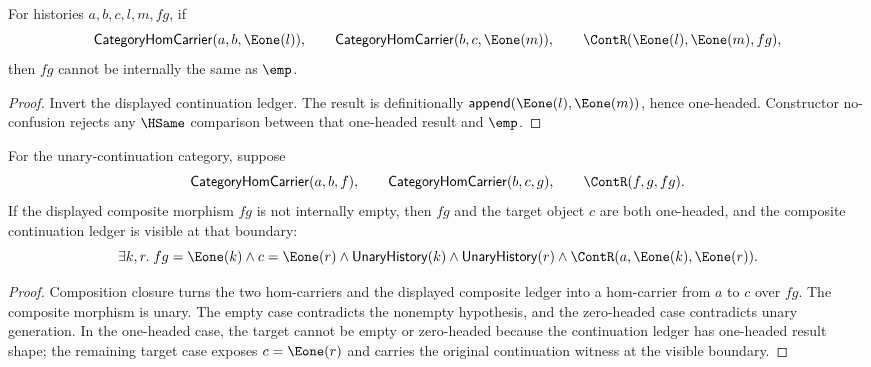 \begin{theorem}
\label{thm:category-hom-carrier-visible-composite-result-not-empty}
For histories $a,b,c,l,m,fg$, if
$$
\mathsf{CategoryHomCarrier}(a,b,\Eone(l)),\qquad
\mathsf{CategoryHomCarrier}(b,c,\Eone(m)),\qquad
\ContR(\Eone(l),\Eone(m),fg),
$$
then $fg$ cannot be internally the same as $\emp$.
\end{theorem}
\begin{proof}
Invert the displayed continuation ledger. The result is definitionally
$\mathsf{append}(\Eone(l),\Eone(m))$, hence one-headed. Constructor
no-confusion rejects any $\HSame$ comparison between that one-headed result and
$\emp$.
\end{proof}

\begin{theorem}
\label{thm:category-hom-carrier-comp-result-nonempty-target-visible}
For the unary-continuation category, suppose
$$
\mathsf{CategoryHomCarrier}(a,b,f),\qquad
\mathsf{CategoryHomCarrier}(b,c,g),\qquad
\ContR(f,g,fg).
$$
If the displayed composite morphism $fg$ is not internally empty, then $fg$
and the target object $c$ are both one-headed, and the composite continuation
ledger is visible at that boundary:
$$
\exists k,r.\;
fg=\Eone(k)\land c=\Eone(r)\land
\mathsf{UnaryHistory}(k)\land \mathsf{UnaryHistory}(r)\land
\ContR(a,\Eone(k),\Eone(r)).
$$
\end{theorem}
\begin{proof}
Composition closure turns the two hom-carriers and the displayed composite
ledger into a hom-carrier from $a$ to $c$ over $fg$. The composite morphism is
unary. The empty case contradicts the nonempty hypothesis, and the zero-headed
case contradicts unary generation. In the one-headed case, the target cannot
be empty or zero-headed because the continuation ledger has one-headed result
shape; the remaining target case exposes $c=\Eone(r)$ and carries the original
continuation witness at the visible boundary.
\end{proof}

